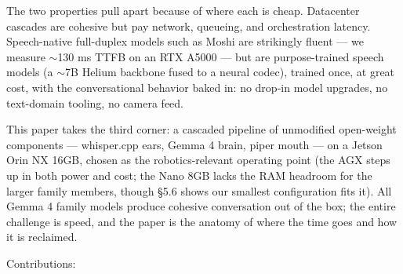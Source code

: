 \documentclass[journal]{IEEEtran}
\begin{document}
The two properties pull apart because of where each is cheap. Datacenter cascades are cohesive but pay network, queueing, and orchestration latency. Speech-native full-duplex models such as Moshi \cite{defossez2024moshi} are strikingly fluent — we measure $\sim$130 ms TTFB on an RTX A5000 — but are purpose-trained speech models (a $\sim$7B Helium backbone fused to a neural codec), trained once, at great cost, with the conversational behavior baked in: no drop-in model upgrades, no text-domain tooling, no camera feed.

This paper takes the third corner: a cascaded pipeline of unmodified open-weight components — whisper.cpp ears, Gemma 4 brain, piper mouth — on a Jetson Orin NX 16GB, chosen as the robotics-relevant operating point (the AGX steps up in both power and cost; the Nano 8GB lacks the RAM headroom for the larger family members, though §5.6 shows our smallest configuration fits it). All Gemma 4 family models produce cohesive conversation out of the box; the entire challenge is speed, and the paper is the anatomy of where the time goes and how it is reclaimed.

Contributions:
\end{document}
